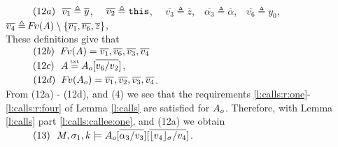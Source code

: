 \begin{description}
\\
$\strut \ \ \hspace{0.5cm} \ \  (12a) \ \  \overline {v_1} \triangleq \overline y$, \ \ $\overline {v_2} \triangleq  \mbox{\normalfont{\texttt{this}}}$, \ \ $\overline {v_3} \triangleq  \overline z$,\ \ $\overline {\alpha_3} \triangleq  \overline \alpha$,\ \ $\overline {v_6} \triangleq  y_0 $, \ \  $\overline {v_4} \triangleq  {\hspace{-1pt}F\hspace{-1pt}}v(A)\setminus \{  \overline {v_1},  \overline {v_6}, \overline z \}$,  
\\
These definitions give that
\\
$\strut \ \ \hspace{0.5cm} \ \  (12b) \ \  {\hspace{-1pt}F\hspace{-1pt}}v(A)=\overline {v_1}, \overline {v_6}, \overline{v_3}, \overline{v_4}$
\\
$\SPS (12c) \ \  A \txteq \Ao[\overline {v_6/v_2}]$, 
\\
$\strut \ \ \hspace{0.5cm} \ \  (12d) \ \  {\hspace{-1pt}F\hspace{-1pt}}v(A_{o})=\overline {v_1}, \overline {v_2}, \overline{v_3}, \overline{v_4}$.
\\
From (12a) - (12d),  and (4) we see that the requirements  \ref{l:calls:r:one}-\ref{l:calls:r:four} of Lemma \ref{l:calls}  are satisfied for $A_{o}$.
  Therefore, with     Lemma   \ref{l:calls} part \ref{l:calls:callee:one}, and (12a) we obtain\\
$\strut \ \ \hspace{0.5cm} \ \  (13) \ \  M,\sigma_1 ,{k} \models {A_{o}[\overline{\alpha_3/v_3}][\overline {\lfloor v_4 \rfloor_{\sigma}/v_4} ] } $.


\end{description}
